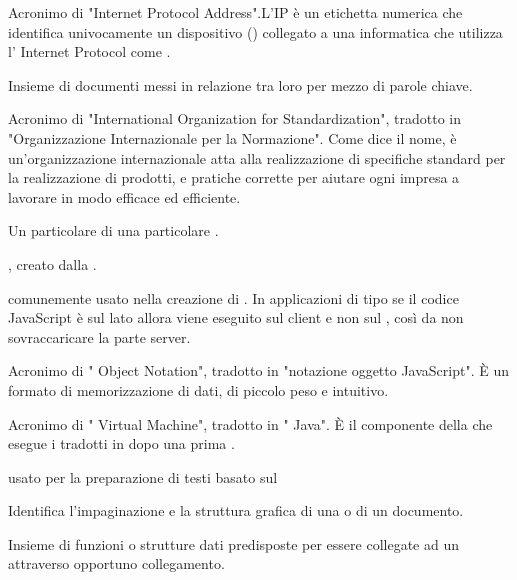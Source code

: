 {Acronimo di "Internet Protocol Address".L'IP è un etichetta numerica che identifica univocamente un dispositivo () collegato a una  informatica che utilizza l' Internet Protocol come .}

{Insieme di documenti messi in relazione tra loro per mezzo di parole chiave.} 

{Acronimo di "International Organization for Standardization", tradotto in "Organizzazione Internazionale per la Normazione". Come dice il nome, è un'organizzazione internazionale atta alla realizzazione di specifiche standard per la realizzazione di prodotti,  e pratiche corrette per aiutare ogni impresa a lavorare in modo efficace ed efficiente.}

{Un particolare  di una particolare .}




{ , creato dalla .}

{  comunemente usato nella creazione di . In applicazioni di tipo  se il codice JavaScript è sul lato  allora viene eseguito sul client e non sul , così da non sovraccaricare la parte server.}

{Acronimo di " Object Notation", tradotto in "notazione oggetto JavaScript". \`{E} un formato di memorizzazione di dati, di piccolo peso e intuitivo.}

{Acronimo di " Virtual Machine", tradotto in " Java". \`{E} il componente della  che esegue i  tradotti in  dopo una prima .}




{ usato per la preparazione di testi basato sul  }

{Identifica l'impaginazione e la struttura grafica di una  o di un documento.}

{Insieme di funzioni o strutture dati predisposte per essere collegate ad un   attraverso opportuno collegamento.}

